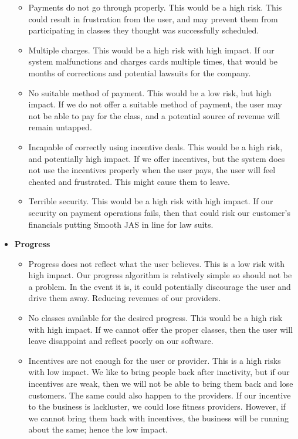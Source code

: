 \documentclass[12pt]{article}
\begin{document}
\begin{itemize}
\begin{itemize}
\item Payments do not go through properly. This would be a high risk. This could result in frustration from the user, and may prevent them from participating in classes they thought was successfully scheduled. 
\item Multiple charges. This would be a high risk with high impact. If our system malfunctions and charges cards multiple times, that would be months of corrections and potential lawsuits for the company. 
\item No suitable method of payment. This would be a low risk, but high impact. If we do not offer a suitable method of payment, the user may not be able to pay for the class, and a potential source of revenue will remain untapped.
\item Incapable of correctly using incentive deals. This would be a high risk, and potentially high impact. If we offer incentives, but the system does not use the incentives properly when the user pays, the user will feel cheated and frustrated. This might cause them to leave.
\item Terrible security. This would be a high risk with high impact. If our security on payment operations fails, then that could risk our customer's financials putting Smooth JAS in line for law suits. 
\end{itemize}
\item \textbf{Progress}
\begin{itemize}
\item Progress does not reflect what the user believes. This is a low risk with high impact. Our progress algorithm is relatively simple so should not be a problem. In the event it is, it could potentially discourage the user and drive them away. Reducing revenues of our providers. 
\item No classes available for the desired progress. This would be a high risk with high impact. If we cannot offer the proper classes, then the user will leave disappoint and reflect poorly on our software. 
\item Incentives are not enough for the user or provider. This is a high risks with low impact. We like to bring people back after inactivity, but if our incentives are weak, then we will not be able to bring them back and lose customers. The same could also happen to the providers. If our incentive to the business is lackluster, we could lose fitness providers. However, if we cannot bring them back with incentives, the business will be running about the same; hence the low impact. 

\end{itemize}
\end{itemize}
\end{document}
